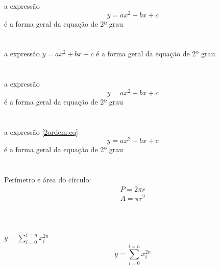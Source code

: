 \documentclass[11pt,openright,twoside]{report}
\begin{document}
a expressão $$y = ax^2 + bx + c$$ é a forma geral da equação de 2º grau
\\\\\\
a expressão $y = ax^2 + bx + c$ é a forma geral da equação
de 2º grau
\\\\\\
a expressão
\[
y = ax^2 + bx + c
\]
é a forma geral da equação de 2º grau
\\\\\\
a expressão \ref{2ordem.eq}
\begin{equation}
y = ax^2 + bx + c \label{2ordem.eq}
\end{equation}
é a forma geral da equação de 2º grau
\\\\\\
Perímetro e área do círculo:
\begin{eqnarray}
P = 2\pi r \\
A = \pi r^2
\end{eqnarray}
\\\\\\
$y = \sum_{i=0}^{i=n}{x_{i}^{2n}}$
$$y = \sum_{i=0}^{i=n}{x_{i}^{2n}}$$
\\
\end{document}

